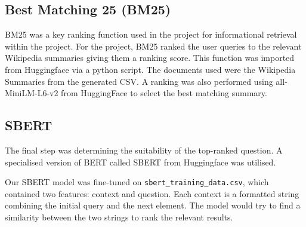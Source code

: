 \documentclass[11pt]{article}
\begin{document}
\subsection{Best Matching 25 (BM25)}
BM25 was a key ranking function used in the project for informational retrieval within the project. For the project, BM25 ranked the user queries to the relevant Wikipedia summaries giving them a ranking score. This function was imported from Huggingface via a python script. 
 \newline
 \newline
The documents used were the Wikipedia Summaries from the generated CSV. A ranking was also performed using all-MiniLM-L6-v2 from HuggingFace to select the best matching summary.


\subsection{SBERT}
The final step was determining the suitability of the top-ranked question. A specialised version of BERT called SBERT from Huggingface was utilised.

Our SBERT model was fine-tuned on \texttt{sbert\_training\_data.csv}, which contained two features: context and question. Each context is a formatted string combining the initial query and the next element. The model would try to find a similarity between the two strings to rank the relevant results.
\end{document}

